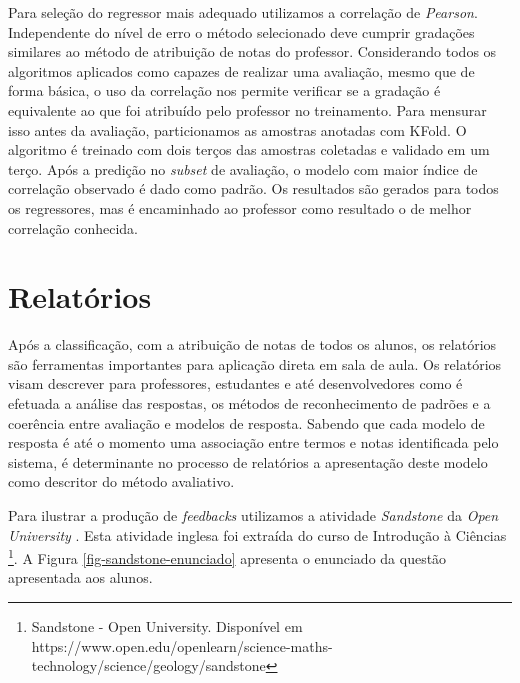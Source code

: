 Para seleção do regressor mais adequado utilizamos a correlação de \textit{Pearson}. Independente do nível de erro o método selecionado deve cumprir gradações similares ao método de atribuição de notas do professor. Considerando todos os algoritmos aplicados como capazes de realizar uma avaliação, mesmo que de forma básica, o uso da correlação nos permite verificar se a gradação é equivalente ao que foi atribuído pelo professor no treinamento. Para mensurar isso antes da avaliação, particionamos as amostras anotadas com KFold. O algoritmo é treinado com dois terços das amostras coletadas e validado em um terço. Após a predição no \textit{subset} de avaliação, o modelo com maior índice de correlação observado é dado como padrão. Os resultados são gerados para todos os regressores, mas é encaminhado ao professor como resultado o de melhor correlação conhecida.

\section{Relatórios}
\label{sec-relatorios}

Após a classificação, com a atribuição de notas de todos os alunos, os relatórios são ferramentas importantes para aplicação direta em sala de aula. Os relatórios visam descrever para professores, estudantes e até desenvolvedores como é efetuada a análise das respostas, os métodos de reconhecimento de padrões e a coerência entre avaliação e modelos de resposta. Sabendo que cada modelo de resposta é até o momento uma associação entre termos e notas identificada pelo sistema, é determinante no processo de relatórios a apresentação deste modelo como descritor do método avaliativo.

Para ilustrar a produção de \textit{feedbacks} utilizamos a atividade \textit{Sandstone} da \textit{Open University} \cite{jordan2012}. Esta atividade inglesa foi extraída do curso de Introdução à Ciências \footnote{Sandstone - Open University. Disponível em https://www.open.edu/openlearn/science-maths-technology/science/geology/sandstone}. A Figura \ref{fig-sandstone-enunciado} apresenta o enunciado da questão apresentada aos alunos.

